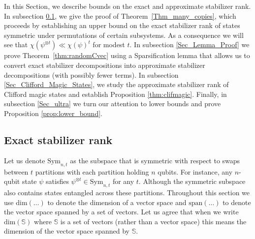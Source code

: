 In this Section, we describe bounds on the exact and approximate stabilizer rank. In subsection \ref{Sec_Symmetric_states}, we give the proof of Theorem~\ref{Thm_many_copies}, which proceeds by establishing an upper bound on the exact stabilizer rank of states symmetric under permutations of certain subsystems. As a consequence we will see that $\chi(\psi^{\otimes t}) \ll \chi(\psi)^t$ for modest $t$. In subsection \ref{Sec_Lemma_Proof} we prove Theorem~\ref{thm:randomCvec} using a Sparsification lemma that allows us to convert exact stabilizer decompositions into approximate stabilizer decompositions (with possibly fewer terms). In subsection \ref{Sec_Clifford_Magic_States}, we study the approximate stabilizer rank of Clifford magic states and establish Proposition \ref{thm:clifmagic}. Finally, in subsection \ref{Sec_ultra} we turn our attention to lower bounds and prove Proposition \ref{prop:lower_bound}.

\subsection{Exact stabilizer rank}
\label{Sec_Symmetric_states}
 Let us denote $\mathrm{Sym}_{n,t}$ as the subspace that is symmetric with respect to swaps between $t$ partitions with each partition holding $n$ qubits.  For instance, any $n$-qubit state $\psi$ satisfies $\psi^{\otimes t} \in \mathrm{Sym}_{n,t}$ for any $t$. Although the symmetric subspace also contains states entangled across these partitions.  Throughout this section we use $\mathrm{dim}( \ldots)$ to denote the dimension of a vector space and  $\mathrm{span}( \ldots)$ to denote the vector space spanned by a set of vectors.  Let us agree that when we write $\mathrm{dim}( \mathbb{S} )$ where $\mathbb{S}$ is a set of vectors (rather than a vector space) this means the dimension of the vector space spanned by $\mathbb{S}$.


